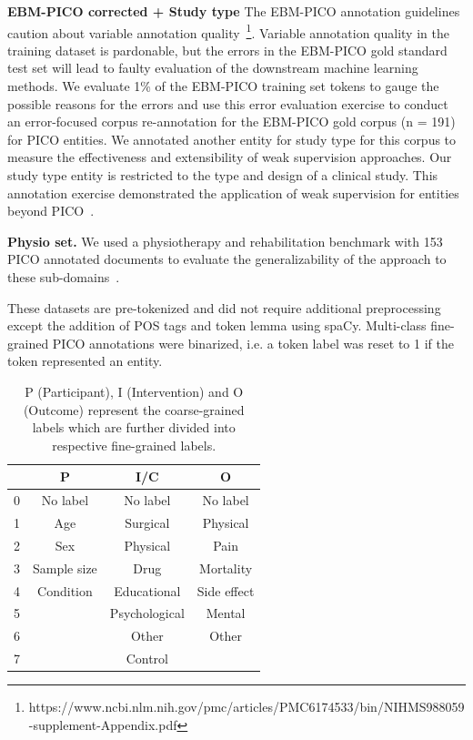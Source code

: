 \documentclass[10.7pt,]{article}
\begin{document}
\textbf{EBM-PICO corrected + Study type}
The EBM-PICO annotation guidelines caution about variable annotation quality~\footnote{https://www.ncbi.nlm.nih.gov/pmc/articles/PMC6174533/bin/NIHMS988059-supplement-Appendix.pdf}.
Variable annotation quality in the training dataset is pardonable, but the errors in the EBM-PICO gold standard test set will lead to faulty evaluation of the downstream machine learning methods.
We evaluate 1\% of the EBM-PICO training set tokens to gauge the possible reasons for the errors and use this error evaluation exercise to conduct an error-focused corpus re-annotation for the EBM-PICO gold corpus (n = 191) for PICO entities.
We annotated another entity for study type for this corpus to measure the effectiveness and extensibility of weak supervision approaches.
Our study type entity is restricted to the type and design of a clinical study.
This annotation exercise demonstrated the application of weak supervision for entities beyond PICO~\cite{menard2019turning}.

\textbf{Physio set.} We used a physiotherapy and rehabilitation benchmark with 153 PICO annotated documents to evaluate the generalizability of the approach to these sub-domains~\cite{dhrangadhariya2021end}.

These datasets are pre-tokenized and did not require additional preprocessing except the addition of POS tags and token lemma using spaCy.
Multi-class fine-grained PICO annotations were binarized, i.e. a token label was reset to 1 if the token represented an entity.
%
%
%
\begin{table}[h!]
\begin{center}
\begin{tabular}{| c | c | c | c |} 
\hline
 & P & I/C & O \\ 
\hline
0 & No label & No label & No label \\ 
1 & Age & Surgical & Physical \\ 
2 & Sex & Physical & Pain \\
3 & Sample size & Drug & Mortality \\
4 & Condition & Educational & Side effect \\
5 &  & Psychological & Mental \\
6 &  & Other & Other \\
7 &  & Control &  \\
\hline
\end{tabular}
\caption{\label{table:coarsefineconcept} P (Participant), I (Intervention) and O (Outcome) represent the coarse-grained labels which are further divided into respective fine-grained labels.}
\end{center}
\end{table}
%
%
%
\end{document}
